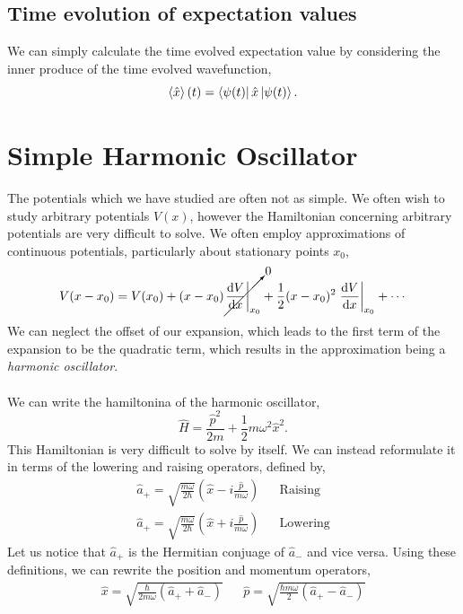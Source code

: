 \documentclass{book}
\begin{document}
\subsection{Time evolution of expectation values}
We can simply calculate the time evolved expectation value by considering the inner produce of the time evolved wavefunction,
\begin{equation}
	\left<\hat{x}\right>(t) = \bra{\psi(t)}\hat{x}\ket{\psi(t)}.
\end{equation}
\section{Simple Harmonic Oscillator}
The potentials which we have studied are often not as simple. We often wish to study arbitrary potentials $V(x)$, however the Hamiltonian concerning arbitrary potentials are very difficult to solve. We often employ approximations of continuous potentials, particularly about stationary points $x_0$,
\begin{equation}
	V(x - x_0) = V(x_0) + (x-x_0)\cancelto{0}{\eval{\dv{V}{x}}_{x_0}} + \frac{1}{2}(x-x_0)^2\eval{\dv{V}{x}}_{x_0} + \cdots
\end{equation}
We can neglect the offset of our expansion, which leads to the first term of the expansion to be the quadratic term, which results in the approximation being a \textit{harmonic oscillator}.
\\\\
We can write the hamiltonina of the harmonic oscillator,
\begin{equation}
	\hat{H} = \frac{\hat{p}^2}{2m} + \frac{1}{2}m\omega^2\hat{x}^2.
\end{equation}
This Hamiltonian is very difficult to solve by itself. We can instead reformulate it in terms of the lowering and raising operators, defined by,
\begin{align}
	\hat{a}_+ = \sqrt{\frac{m\omega}{2\hbar}}\left(\hat{x} - i \frac{\hat{p}}{m\omega}\right) && \text{Raising} \\
	\hat{a}_+ = \sqrt{\frac{m\omega}{2\hbar}}\left(\hat{x} + i \frac{\hat{p}}{m\omega}\right) && \text{Lowering}
\end{align}
Let us notice that $\hat{a}_+$ is the Hermitian conjuage of $\hat{a}_-$ and vice versa. Using these definitions, we can rewrite the position and momentum operators,
\begin{align}
	\hat{x} = \sqrt{\frac{\hbar}{2m\omega}\left(\hat{a}_+ + \hat{a}_-\right)} && \hat{p} = \sqrt{\frac{\hbar m\omega}{2}\left(\hat{a}_+ - \hat{a}_-\right)} \label{eq:momentum}
\end{align}
\end{document}
